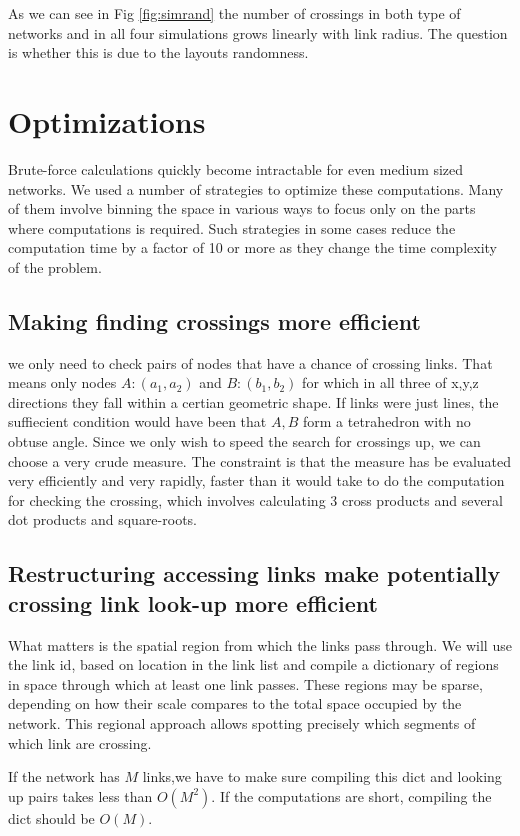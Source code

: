 \documentclass[nofootinbib,preprint,floatfix,titlepage,endfloats,superscriptaddress]{revtex4} %
\begin{document}
As we can see in Fig \ref{fig:simrand} the number of crossings in both type of networks and in all four simulations grows linearly with link radius. The question is whether this is due to the layouts randomness. 

\section{Optimizations}
Brute-force calculations quickly become intractable for even medium sized networks. We used a number of strategies to optimize these computations. Many of them involve binning the space in various ways to focus only on the parts where computations is required. Such strategies in some cases reduce the computation time by a factor of 10 or more as they change the time complexity of the problem. 

\subsection{Making finding crossings more efficient}
we only need to check pairs of nodes that have a chance of crossing links. That means only nodes $A:(a_1,a_2)$ and $B:(b_1,b_2)$ for which in all three of x,y,z directions they fall within a certian geometric shape. If links were just lines, the suffiecient condition would have been that $A,B$ form a tetrahedron with no obtuse angle. Since we only wish to speed the search for crossings up, we can choose a very crude measure. The constraint is that the measure has be evaluated very efficiently and very rapidly, faster than it would take to do the computation for checking the crossing, which involves calculating 3 cross products and several dot products and square-roots. 
\subsection{ Restructuring accessing links make potentially crossing link look-up more efficient}

What matters is the spatial region from which the links pass through. We will use the link id, based on location in the link list and compile a dictionary of regions in space through which at least one link passes. These regions may be sparse, depending on how their scale compares to the total space occupied by the network. This regional approach allows spotting precisely which segments of which link are crossing. 


If the network has $M$ links,we have to make sure compiling this dict and looking up pairs takes less than $O(M^2)$. If the computations are short, compiling the dict should be $O(M)$. 
\end{document}
